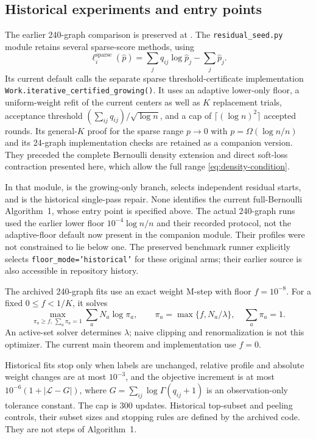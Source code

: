 \subsection{Historical experiments and entry points}
The earlier 240-graph comparison is preserved at
.
The \texttt{residual\_seed.py} module retains several sparse-score methods, using
\[
 \ell_i^{\mathrm{sparse}}(\widehat p)=\sum_jq_{ij}\log\widehat p_j-\sum_j\widehat p_j.
\]
Its current default  calls the separate sparse threshold-certificate implementation \texttt{Work.iterative\_certified\_growing()}. It uses an adaptive lower-only floor, a uniform-weight refit of the current centers as well as $K$ replacement trials, acceptance threshold $(\sum_{ij}q_{ij})/\sqrt{\log n}$, and a cap of $\lceil(\log n)^2\rceil$ accepted rounds. Its general-$K$ proof for the sparse range $p\to0$ with $p=\Omega(\log n/n)$ and its 24-graph implementation checks are retained as a companion version. They preceded the complete Bernoulli density extension and direct soft-loss contraction presented here, which allow the full range \eqref{eq:density-condition}.

In that module,  is the growing-only branch,  selects independent residual starts, and  is the historical single-pass repair. None identifies the current full-Bernoulli Algorithm~1, whose entry point is specified above. The actual 240-graph runs used the earlier lower floor $10^{-4}\log n/n$ and their recorded protocol, not the adaptive-floor default now present in the companion module. Their profiles were not constrained to lie below one. The preserved benchmark runner explicitly selects \texttt{floor\_mode='historical'} for these original arms; their earlier source is also accessible in repository history.

The archived 240-graph fits use an exact weight M-step with floor $f=10^{-8}$. For a fixed $0\le f<1/K$, it solves
\[
 \max_{\pi_a\ge f,\,\sum_a\pi_a=1}\sum_aN_a\log\pi_a,
 \qquad \pi_a=\max\{f,N_a/\lambda\},
 \quad\sum_a\pi_a=1.
\]
An active-set solver determines $\lambda$; naive clipping and renormalization is not this optimizer. The current main theorem and implementation use $f=0$.

Historical fits stop only when labels are unchanged, relative profile and absolute weight changes are at most $10^{-3}$, and the objective increment is at most $10^{-6}(1+|\mathcal L-G|)$, where $G=\sum_{ij}\log\Gamma(q_{ij}+1)$ is an observation-only tolerance constant. The cap is 300 updates. Historical top-subset and peeling controls, their subset sizes and stopping rules are defined by the archived code. They are not steps of Algorithm~1.

